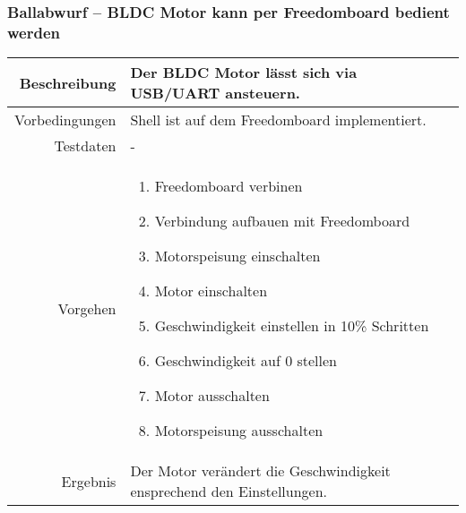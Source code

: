 \newpage
\subsubsection{Ballabwurf -- BLDC Motor kann per Freedomboard bedient werden}
\begin{table}[h!]
	\renewcommand{\arraystretch}{1.5}
	\begin{tabular}{|r|p{14cm}|}
		\hline Beschreibung	& Der BLDC Motor lässt sich via USB/UART ansteuern. \\ 
		\hline Vorbedingungen	& Shell ist auf dem Freedomboard implementiert. \\ 
		\hline Testdaten	& - \\ 
		\hline Vorgehen		& 
		\begin{enumerate}
			\item Freedomboard verbinen
			\item Verbindung aufbauen mit Freedomboard
			\item Motorspeisung einschalten
			\item Motor einschalten
			\item Geschwindigkeit einstellen in 10\% Schritten
			\item Geschwindigkeit auf 0 stellen
			\item Motor ausschalten
			\item Motorspeisung ausschalten 
		\end{enumerate} \\ 
		\hline Ergebnis 	&
			Der Motor verändert die Geschwindigkeit ensprechend
			den Einstellungen.\\ 
		\hline 
	\end{tabular}
\end{table}

\newpage
